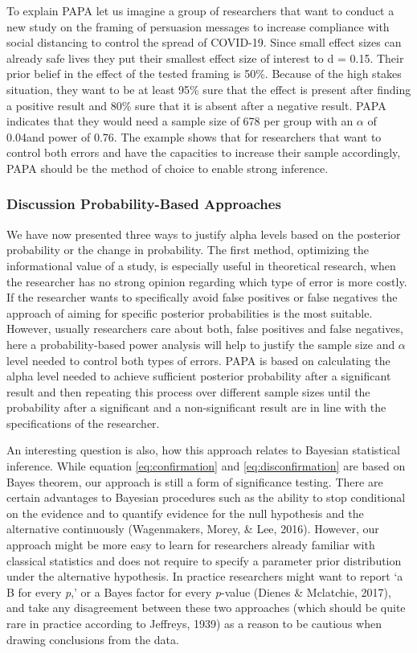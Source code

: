 \documentclass[
  english,
  ,jou,floatsintext]{apa6}
\begin{document}
To explain PAPA let us imagine a group of researchers that want to conduct a new study on the framing of persuasion messages to increase compliance with social distancing to control the spread of COVID-19. Since small effect sizes can already safe lives they put their smallest effect size of interest to d = 0.15. Their prior belief in the effect of the tested framing is 50\%. Because of the high stakes situation, they want to be at least 95\% sure that the effect is present after finding a positive result and 80\% sure that it is absent after a negative result.
PAPA indicates that they would need a sample size of 678 per group with an \(\alpha\) of 0.04and power of 0.76.
The example shows that for researchers that want to control both errors and have the capacities to increase their sample accordingly, PAPA should be the method of choice to enable strong inference.

\hypertarget{discussion-probability-based-approaches}{%
\subsubsection{Discussion Probability-Based Approaches}\label{discussion-probability-based-approaches}}

We have now presented three ways to justify alpha levels based on the posterior probability or the change in probability. The first method, optimizing the informational value of a study, is especially useful in theoretical research, when the researcher has no strong opinion regarding which type of error is more costly. If the researcher wants to specifically avoid false positives or false negatives the approach of aiming for specific posterior probabilities is the most suitable. However, usually researchers care about both, false positives and false negatives, here a probability-based power analysis will help to justify the sample size and \(\alpha\) level needed to control both types of errors. PAPA is based on calculating the alpha level needed to achieve sufficient posterior probability after a significant result and then repeating this process over different sample sizes until the probability after a significant and a non-significant result are in line with the specifications of the researcher.

An interesting question is also, how this approach relates to Bayesian statistical inference. While equation \ref{eq:confirmation} and \ref{eq:disconfirmation} are based on Bayes theorem, our approach is still a form of significance testing. There are certain advantages to Bayesian procedures such as the ability to stop conditional on the evidence and to quantify evidence for the null hypothesis and the alternative continuously (Wagenmakers, Morey, \& Lee, 2016). However, our approach might be more easy to learn for researchers already familiar with classical statistics and does not require to specify a parameter prior distribution under the alternative hypothesis. In practice researchers might want to report `a B for every \emph{p},' or a Bayes factor for every \emph{p}-value (Dienes \& Mclatchie, 2017), and take any disagreement between these two approaches (which should be quite rare in practice according to Jeffreys, 1939) as a reason to be cautious when drawing conclusions from the data.
\end{document}
